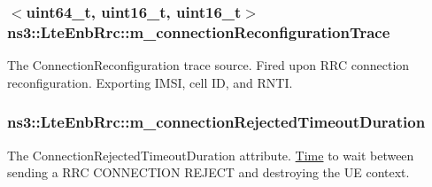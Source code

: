 \subsubsection[{\texorpdfstring{m\+\_\+connection\+Reconfiguration\+Trace}{m_connectionReconfigurationTrace}}]{$<$uint64\+\_\+t, uint16\+\_\+t, uint16\+\_\+t$>$ ns3\+::\+Lte\+Enb\+Rrc\+::m\+\_\+connection\+Reconfiguration\+Trace\hspace{0.3cm}{\ttfamily [private]}}\hypertarget{classns3_1_1LteEnbRrc_abd0a3deec4a7123637d9604616e934df}{}\label{classns3_1_1LteEnbRrc_abd0a3deec4a7123637d9604616e934df}
The {\ttfamily Connection\+Reconfiguration} trace source. Fired upon R\+RC connection reconfiguration. Exporting I\+M\+SI, cell ID, and R\+N\+TI. 
\subsubsection[{\texorpdfstring{m\+\_\+connection\+Rejected\+Timeout\+Duration}{m_connectionRejectedTimeoutDuration}}]{ ns3\+::\+Lte\+Enb\+Rrc\+::m\+\_\+connection\+Rejected\+Timeout\+Duration\hspace{0.3cm}{\ttfamily [private]}}\hypertarget{classns3_1_1LteEnbRrc_a6624cf55251a24138828f010a42ab1ea}{}\label{classns3_1_1LteEnbRrc_a6624cf55251a24138828f010a42ab1ea}
The {\ttfamily Connection\+Rejected\+Timeout\+Duration} attribute. \hyperlink{classns3_1_1Time}{Time} to wait between sending a R\+RC C\+O\+N\+N\+E\+C\+T\+I\+ON R\+E\+J\+E\+CT and destroying the UE context. 
